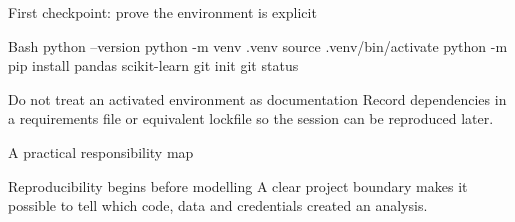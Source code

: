 \documentclass[../m00-session-01.tex]{subfiles}
\begin{document}

\begin{frame}[fragile]{First checkpoint: prove the environment is explicit}
  \begin{CodeBlock}[numbers=left]{Bash}
python --version
python -m venv .venv
source .venv/bin/activate
python -m pip install pandas scikit-learn
git init
git status
  \end{CodeBlock}
  \begin{WarningBox}{Do not treat an activated environment as documentation}
    Record dependencies in a requirements file or equivalent lockfile so the session can be reproduced later.
  \end{WarningBox}
\end{frame}

\begin{frame}{A practical responsibility map}
  \centering
  \vspace{.35cm}
  \begin{TakeawayBox}{Reproducibility begins before modelling}
    A clear project boundary makes it possible to tell which code, data and credentials created an analysis.
  \end{TakeawayBox}
\end{frame}
\end{document}
